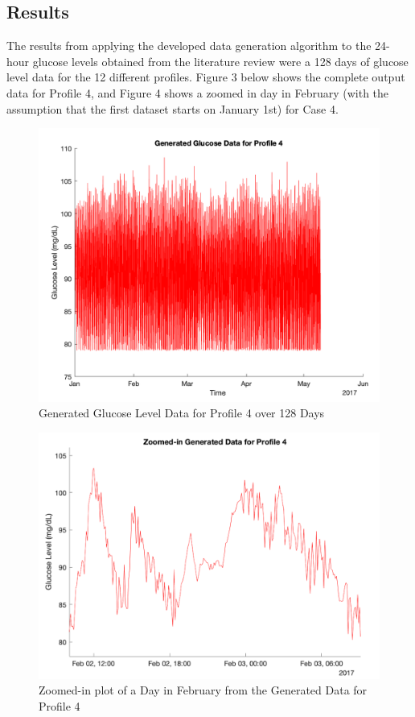 
\subsection{Results}
\label{subsec:data_results}
The results from applying the developed data generation algorithm to the 24-hour glucose levels obtained from the literature review were a 128 days of glucose level data for the 12 different profiles. Figure 3 below shows the complete output data for Profile 4, and Figure 4 shows a zoomed in day in February (with the assumption that the first dataset starts on January 1st) for Case 4.

\begin{center}
\begin{figure}[ht!]
	\centering
    \includegraphics[width=\textwidth]{Figures/LEEN/figure333.png}
 	\caption{Generated Glucose Level Data for Profile 4 over 128 Days}
  	\label{fig-culogo}
\end{figure}
\begin{figure}[ht!]
	\centering
    \includegraphics[width=\textwidth]{Figures/LEEN/fig4.png}
 	\caption{Zoomed-in plot of a Day in February from the Generated Data for Profile 4}
  	\label{fig-culogo}
    \end{figure}
\end{center}


